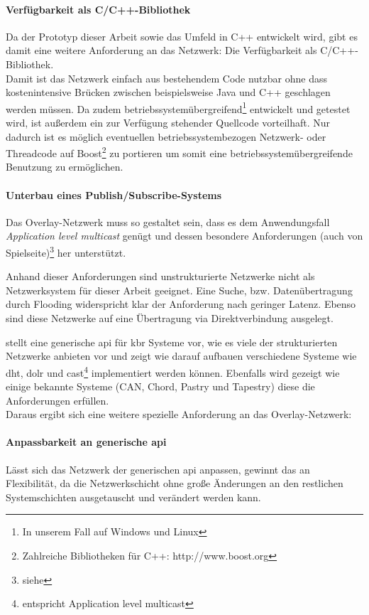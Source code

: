 \paragraph{Verfügbarkeit als C/C++-Bibliothek} Da der Prototyp dieser Arbeit sowie das Umfeld in C++ entwickelt wird, gibt es damit eine weitere Anforderung an das Netzwerk: Die Verfügbarkeit als C/C++-Bibliothek.\\
Damit ist das Netzwerk einfach aus bestehendem Code nutzbar ohne dass kostenintensive Brücken zwischen beispielsweise Java und C++ geschlagen werden müssen. Da zudem betriebssystemübergreifend\footnote{In unserem Fall auf Windows und Linux} entwickelt und getestet wird, ist außerdem ein zur Verfügung stehender Quellcode vorteilhaft. Nur dadurch ist es möglich eventuellen betriebssystembezogen Netzwerk- oder Threadcode auf  Boost\footnote{Zahlreiche Bibliotheken für C++: http://www.boost.org} zu portieren um somit eine betriebssystemübergreifende Benutzung zu ermöglichen.

\paragraph{Unterbau eines Publish/Subscribe-Systems} Das Overlay-Netzwerk muss so gestaltet sein, dass es dem Anwendungsfall \emph{Application level multicast} genügt und dessen besondere Anforderungen (auch von Spielseite)\footnote{siehe } her unterstützt.

Anhand dieser Anforderungen sind unstrukturierte Netzwerke nicht als Netzwerksystem für dieser Arbeit geeignet. Eine Suche, bzw. Datenübertragung durch Flooding widerspricht klar der Anforderung nach geringer Latenz. Ebenso sind diese Netzwerke auf eine Übertragung via Direktverbindung ausgelegt.

\cite{Dabek2003Towards} stellt eine generische \ac{api} für \ac{kbr} Systeme vor, wie es viele der strukturierten Netzwerke anbieten vor und zeigt wie darauf aufbauen verschiedene Systeme wie \ac{dht}, \ac{dolr} und \ac{cast}\footnote{entspricht Application level multicast} implementiert werden können. Ebenfalls wird gezeigt wie einige bekannte Systeme (CAN, Chord, Pastry und Tapestry) diese die Anforderungen erfüllen.\\
Daraus ergibt sich eine weitere spezielle Anforderung an das Overlay-Netzwerk:

\paragraph{Anpassbarkeit an generische \ac{api}} Lässt sich das Netzwerk der generischen \ac{api} anpassen, gewinnt das an Flexibilität, da die Netzwerkschicht ohne große Änderungen an den restlichen Systemschichten ausgetauscht und verändert werden kann.

